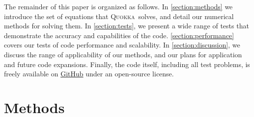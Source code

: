 \documentclass[fleqn,usenatbib]{mnras}
\newcommand{\quokka}{\textsc{Quokka}}
\begin{document}
The remainder of this paper is organized as follows. In \autoref{section:methods} we introduce the set of equations that \quokka~solves, and detail our numerical methods for solving them. In \autoref{section:tests}, we present a wide range of tests that demonstrate the accuracy and capabilities of the code. \autoref{section:performance} covers our tests of code performance and scalability. In \autoref{section:discussion}, we discuss the range of applicability of our methods, and our plans for application and future code expansions. Finally, the code itself, including all test problems, is freely available on \faGithub\href{https://github.com/BenWibking/quokka-code}{GitHub} under an open-source license. 

\section{Methods}
\label{section:methods}
\end{document}
